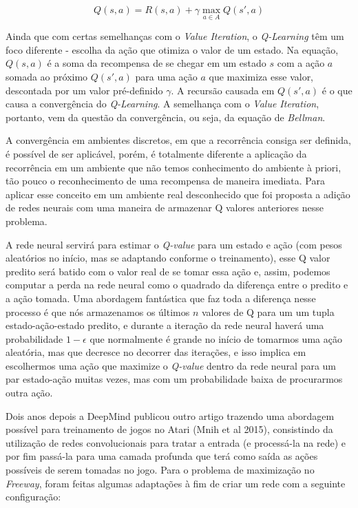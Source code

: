 \documentclass[letterpaper]{article} %
\begin{document}
$$
Q(s,a) = R(s,a) + \gamma \max_{a \in A} Q(s',a)
$$

Ainda que com certas semelhanças com o \textit{Value Iteration}, o \textit{Q-Learning} têm um foco diferente - escolha da ação que otimiza o valor de um estado. Na equação, $Q(s,a)$ é a soma da recompensa de se chegar em um estado $s$ com a ação $a$ somada ao próximo $Q(s',a)$ para uma ação $a$ que maximiza esse valor, descontada por um valor pré-definido $\gamma$. A recursão causada em $Q(s',a)$ é o que causa a convergência do \textit{Q-Learning}. A semelhança com o \textit{Value Iteration}, portanto, vem da questão da convergência, ou seja, da equação de \textit{Bellman}.

A convergência em ambientes discretos, em que a recorrência consiga ser definida, é possível de ser aplicável, porém, é totalmente diferente a aplicação da recorrência em um ambiente que não temos conhecimento do ambiente à priori, tão pouco o reconhecimento de uma recompensa de maneira imediata. Para aplicar esse conceito em um ambiente real desconhecido que foi proposta a adição de redes neurais com uma maneira de armazenar Q valores anteriores nesse problema.

A rede neural servirá para estimar o \textit{Q-value} para um estado e ação (com pesos aleatórios no início, mas se adaptando conforme o treinamento), esse Q valor predito será batido com o valor real de se tomar essa ação e, assim, podemos computar a perda na rede neural como o quadrado da diferença entre o predito e a ação tomada. Uma abordagem fantástica que faz toda a diferença nesse processo é que nós armazenamos os últimos $n$ valores de Q para um um tupla estado-ação-estado predito, e durante a iteração da rede neural haverá uma probabilidade $1-\epsilon$ que normalmente é grande no início de tomarmos uma ação aleatória, mas que decresce no decorrer das iterações, e isso implica em escolhermos uma ação que maximize o \textit{Q-value} dentro da rede neural para um par estado-ação muitas vezes, mas com um probabilidade baixa de procurarmos outra ação.

Dois anos depois a DeepMind publicou outro artigo trazendo uma abordagem possível para treinamento de jogos no Atari (Mnih et al 2015), consistindo da utilização de redes convolucionais para tratar a entrada (e processá-la na rede) e por fim passá-la para uma camada profunda que terá como saída as ações possíveis de serem tomadas no jogo. Para o problema de maximização no \textit{Freeway}, foram feitas algumas adaptações à fim de criar um rede com a seguinte configuração: 
\end{document}
